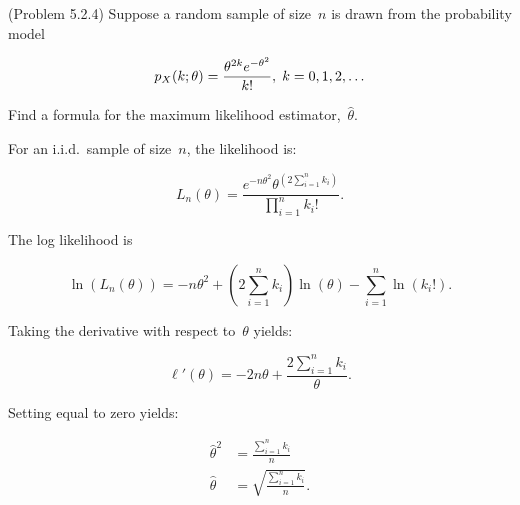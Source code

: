 \begin{problem}
  (\textnormal{Problem 5.2.4}) Suppose a random sample of size~$n$ is drawn from the probability model

  \begin{equation}\label{eq:P03:Distr}
    p_{X}(k;\theta) = \frac{\theta^{2k} e^{-\theta^2}}{k!}, \hspace{0.1cm}k=0,1,2,\ldots
  \end{equation}

  \noindent
  Find a formula for the maximum likelihood estimator,~$\hat{\theta}$.
\end{problem}

For an i.i.d.\ sample of size~$n$, the likelihood is:

\begin{equation}\label{eq:P03:Likelihood}
  L_{n}(\theta) = \frac{e^{-n\theta^{2}} \theta^{\left(2\sum_{i=1}^{n} k_i\right)}}{\prod_{i=1}^{n} k_i !}\text{.}
\end{equation}

\noindent
The log likelihood is

\begin{equation}\label{eq:P03:LogLikelihood}
  \ln\left(L_{n}(\theta)\right) = -n\theta^{2} + {\left(2\sum_{i=1}^{n} k_i\right)} \ln\left(\theta\right) - \sum_{i=1}^{n} \ln\left(k_{i}!\right) \text{.}
\end{equation}

\noindent
Taking the derivative with respect to~$\theta$ yields:

\begin{equation}\label{eq:P03:LogLikelihood:Deriv}
  \ell'(\theta) = -2n\theta + \frac{2\sum_{i=1}^{n} k_i}{\theta}\text{.}
\end{equation}

\noindent
Setting equal to zero yields:

\begin{align}
  \hat{\theta}^{2} &= \frac{\sum_{i=1}^{n} k_i}{n} \\
  \hat{\theta} &= \sqrt{\frac{\sum_{i=1}^{n} k_i}{n}} \text{.}
\end{align}
